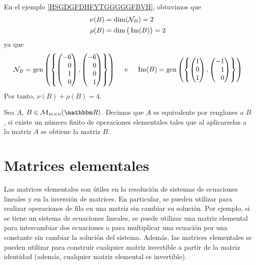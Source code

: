 \begin{example}
    En el ejemplo \ref{HSGDGFDHFYTGGGGGFBVH}, obtuvimos que
    \begin{align*}
        \nu(B) & = \operatorname{dim}(\mathcal{N}_B) = 2 \\
        \rho(B) & = \operatorname{dim}\big(\operatorname{Im}(B)\big) = 2
    \end{align*}
    ya que
    $$\mathcal{N}_B = \Gen \left(\left\{ \begin{pmatrix*}[r]
        -6 \\
        0 \\
        1 \\
        0
    \end{pmatrix*},  \begin{pmatrix*}[r]
        -6 \\
        0 \\
        0 \\
        1
    \end{pmatrix*} \right\}\right) \quad \text{ e } \quad \Ima(B) = \Gen \left(\left\{ \begin{pmatrix}
        1 \\
        0 \\
        1
    \end{pmatrix},  \begin{pmatrix*}[r]
        -1 \\
        1 \\
        0
    \end{pmatrix*} \right\}\right)$$
    Por tanto, $\nu(B) + \rho(B) = 4$.
\end{example}


\begin{definition}
    Sea $A$, $B \in \mathcal{M}_{m\times n} (\RR)$. Decimos que $A$ es equivalente por renglones a $B$, si existe un número finito de operaciones elementales tales que al aplicarselas a la matriz $A$ se obtiene la matriz $B$.
\end{definition}

\section{Matrices elementales}

Las matrices elementales son útiles en la resolución de sistemas de ecuaciones lineales y en la inversión de matrices. En particular, se pueden utilizar para realizar operaciones de fila en una matriz sin cambiar su solución. Por ejemplo, si se tiene un sistema de ecuaciones lineales, se puede utilizar una matriz elemental para intercambiar dos ecuaciones o para multiplicar una ecuación por una constante sin cambiar la solución del sistema. Además, las matrices elementales se pueden utilizar para construir cualquier matriz invertible a partir de la matriz identidad (además, cualquier matriz elemental es invertible).

